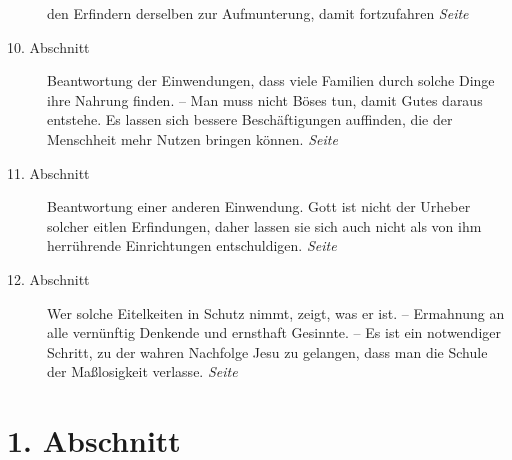 \begin{description}
den Erfindern derselben zur Aufmunterung, damit fortzufahren
\dotfill \textit{Seite~\pageref{kap17_ab9}}\\
\item[10. Abschnitt] Beantwortung der Einwendungen, dass viele Familien durch
solche Dinge ihre Nahrung finden. -- Man muss nicht Böses tun, damit Gutes
daraus entstehe. Es lassen sich bessere Beschäftigungen auffinden, die der
Menschheit mehr Nutzen bringen können.
\dotfill \textit{Seite~\pageref{kap17_ab10}}\\
\item[11. Abschnitt] Beantwortung einer anderen Einwendung. Gott ist nicht der
Urheber solcher eitlen Erfindungen, daher lassen sie sich auch nicht als von
ihm herrührende Einrichtungen entschuldigen.
\dotfill \textit{Seite~\pageref{kap17_ab11}}\\
\item[12. Abschnitt] Wer solche Eitelkeiten in Schutz nimmt, zeigt, was er ist.
-- Ermahnung an alle vernünftig Denkende und ernsthaft Gesinnte. -- Es ist ein
notwendiger Schritt, zu der wahren Nachfolge Jesu zu gelangen, dass man die
Schule der Maßlosigkeit
verlasse.
\dotfill \textit{Seite~\pageref{kap17_ab12}}\\

\end{description}

\newpage

\section{1. Abschnitt} \label{kap17_ab1}

